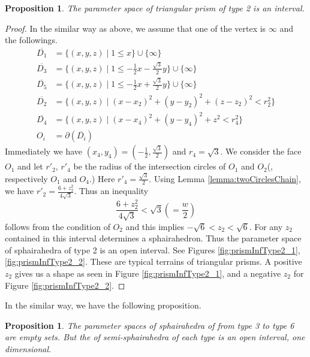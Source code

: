 \documentclass[suppldata, dvipdfmx]{interact}
\theoremstyle{plain}%
\newtheorem{proposition}[theorem]{Proposition}
\theoremstyle{definition}
\theoremstyle{remark}
\theoremstyle{problemstyle}
\begin{document}
\begin{proposition}\label{prop:paraSpace_TriangularPrismType2}
The parameter space of triangular prism of type 2 is an interval.  
\end{proposition}

\begin{proof}
In the similar way as above, we assume that one of the vertex is $\infty$ and the followings.
\begin{align*}
\overline{D_1}&= \{ (x,y,z) \mid 1 \le x \} \cup \{ \infty \}\\
\overline{D_3}&=\{(x,y,z) \mid 1 \le -\frac{1}{2}x-\frac{\sqrt{3}}{2}y \} \cup\{\infty\}\\
\overline{D_5}&=\{(x,y,z) \mid 1 \le -\frac{1}{2}x+\frac{\sqrt{3}}{2}y \} \cup\{\infty\}\\
\overline{D_2}&=\{(x,y,z) \mid (x-x_2)^2+(y-y_2)^2+(z-z_2)^2<r_2^2 \} \\
\overline{D_4}&=\{(x,y,z) \mid (x-x_4)^2+(y-y_4)^2+z^2<r_4^2 \} \\
O_i &= \partial(\overline{D_i})
\end{align*}
Immediately we have $(x_4, y_4)=(-\frac{1}{2},\frac{\sqrt{3}}{2})$ and $r_4=\sqrt{3}$.  We consider the face $O_1$ and let $r'_2$, $r'_4$ be the radius of the intersection circles of $O_1$ and $O_2$(, respectively $O_1$ and $O_4$.)  Here $r'_4=\frac{\sqrt{3}}{2}$.  Using Lemma \ref{lemma:twoCirclesChain}, we have 
$r'_2=\frac{6+z_2^2}{4\sqrt{3}}$.  Thus an inequality
\[
\frac{6+z_2^2}{4\sqrt{3}}<\sqrt{3}(=\frac{w}{2})
\]
follows from the condition of $O_2$ and this implies $-\sqrt{6}<z_2<\sqrt{6}$.  For any $z_2$ contained in this interval determines a sphairahedron.  Thus the parameter space of sphairahedra of type 2 is an open interval.
See Figures \ref{fig:prismInfType2_1}, \ref{fig:prismInfType2_2}.  These are typical terrains of triangular prisms.  A positive $z_2$ gives us a shape as seen in Figure \ref{fig:prismInfType2_1}, and a negative $z_2$ for Figure \ref{fig:prismInfType2_2}.    
\end{proof}

In the similar way, we have the following proposition.

\begin{proposition}\label{prop:paraSpace_TriangularPrism3to6}
The parameter spaces of sphairahedra of from type 3 to type 6 are empty sets.  But the of semi-sphairahedra of each type is an open interval, one dimensional.
\end{proposition}
\end{document}
